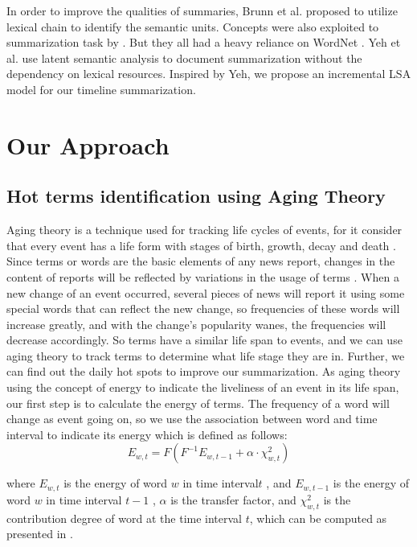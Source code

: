 \documentclass[runningheads,a4paper]{llncs}
\begin{document}
In order to improve the qualities of summaries, Brunn et al. \cite{2001-Brunn-p-} proposed to utilize lexical chain to identify the semantic units. Concepts were also exploited to summarization task by \cite{2007-Ye-p1643-1662}. But they all had a heavy reliance on WordNet \cite{1990-Miller-p235-244}. Yeh et al. \cite{2001-Gong-p19-25} use latent semantic analysis to document summarization without the dependency on lexical resources. Inspired by Yeh, we propose an incremental LSA model for our timeline summarization. 


\section{Our Approach}

\subsection{Hot terms identification using Aging Theory}

Aging theory is a technique used for tracking life cycles of events, for it consider that every event has a life form with stages of birth, growth, decay and death \cite{2003-Chen-p47-59}. Since terms or words are the basic elements of any news report, changes in the content of reports will be reflected by variations in the usage of terms \cite{2007-Chen-p1016-1025}. When a new change of an event occurred, several pieces of news will report it using some special words that can reflect the new change, so frequencies of these words will increase greatly, and with the change’s popularity wanes, the frequencies will decrease accordingly. So terms have a similar life span to events, and we can use aging theory to track terms to determine what life stage they are in. Further, we can find out the daily hot spots to improve our summarization.
As aging theory using the concept of energy to indicate the liveliness of an event in its life span, our first step is to calculate the energy of terms. The frequency of a word will change as event going on, so we use the association between word  and time interval  to indicate its energy which is defined as follows:
\begin{equation}
  E_{w,t} =F(F^{-1}E_{w,t-1}+\alpha\cdot\chi^2_{w,t})
\end{equation}

where $E_{w,t}$ is the energy of word $w$  in time interval$t$ , and $E_{w,t-1}$  is the energy of word $w$ in time interval $t-1$ , $\alpha$ is the transfer factor, and $\chi^2_{w,t}$  is the contribution degree of word  at the time interval $t$, which can be computed as presented in \cite{2000-Swan-p49-56}. 
\end{document}
